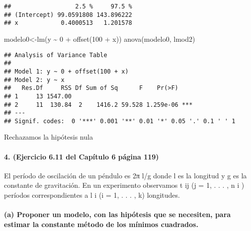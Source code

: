 \documentclass[
]{article}
\newenvironment{Shaded}{\begin{snugshade}}{\end{snugshade}}
\newcommand{\DecValTok}[1]{\textcolor[rgb]{0.00,0.00,0.81}{#1}}
\newcommand{\FunctionTok}[1]{\textcolor[rgb]{0.00,0.00,0.00}{#1}}
\newcommand{\NormalTok}[1]{#1}
\newcommand{\OtherTok}[1]{\textcolor[rgb]{0.56,0.35,0.01}{#1}}
\newcommand{\SpecialCharTok}[1]{\textcolor[rgb]{0.00,0.00,0.00}{#1}}
\begin{document}
\begin{verbatim}
##                  2.5 %     97.5 %
## (Intercept) 99.0591808 143.896222
## x            0.4000513   1.201578
\end{verbatim}

\begin{Shaded}
\begin{Highlighting}[]
\NormalTok{modelo0}\OtherTok{\textless{}{-}}\FunctionTok{lm}\NormalTok{(y }\SpecialCharTok{\textasciitilde{}} \DecValTok{0} \SpecialCharTok{+} \FunctionTok{offset}\NormalTok{(}\DecValTok{100} \SpecialCharTok{+}\NormalTok{ x))}
\FunctionTok{anova}\NormalTok{(modelo0, lmod2)}
\end{Highlighting}
\end{Shaded}

\begin{verbatim}
## Analysis of Variance Table
## 
## Model 1: y ~ 0 + offset(100 + x)
## Model 2: y ~ x
##   Res.Df     RSS Df Sum of Sq      F    Pr(>F)    
## 1     13 1547.00                                  
## 2     11  130.84  2    1416.2 59.528 1.259e-06 ***
## ---
## Signif. codes:  0 '***' 0.001 '**' 0.01 '*' 0.05 '.' 0.1 ' ' 1
\end{verbatim}

Rechazamos la hipótesis nula

\hypertarget{ejercicio-6.11-del-capuxedtulo-6-puxe1gina-119}{%
\paragraph{4. (Ejercicio 6.11 del Capítulo 6 página
119)}\label{ejercicio-6.11-del-capuxedtulo-6-puxe1gina-119}}

El período de oscilación de un péndulo es 2π\textbar{} l/g donde l es la
longitud y g es la constante de gravitación. En un experimento
observamos t ij (j = 1, . . . , n i ) períodos correspondientes a l i (i
= 1, . . . , k) longitudes.

\hypertarget{a-proponer-un-modelo-con-las-hipuxf3tesis-que-se-necesiten-para-estimar-la-constante-muxe9todo-de-los-muxednimos-cuadrados.}{%
\paragraph{(a) Proponer un modelo, con las hipótesis que se necesiten,
para estimar la constante método de los mínimos
cuadrados.}\label{a-proponer-un-modelo-con-las-hipuxf3tesis-que-se-necesiten-para-estimar-la-constante-muxe9todo-de-los-muxednimos-cuadrados.}}
\end{document}
